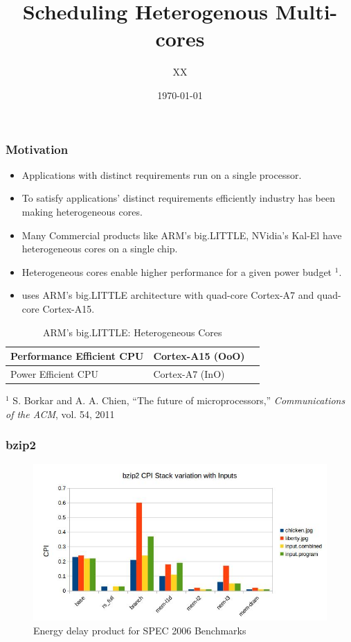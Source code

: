 \documentclass{beamer}
\title[Scheduling Heterogenous Multi-cores]{Scheduling Heterogenous Multi-cores} %
\author{XX} %
\institute[IIT Bombay] %
{
Guide: Prof XX \\ %
\medskip
}
\date{\today} %
\begin{document}
\begin{frame}
\titlepage %
\end{frame}

\begin{frame}
\frametitle{Motivation}
\begin{itemize}
\item Applications with distinct requirements run on a single processor.
\item To satisfy applications' distinct requirements efficiently industry has been making heterogeneous cores.
\item Many Commercial products like ARM's big.LITTLE, NVidia's Kal-El have heterogeneous cores on a single chip.
\item Heterogeneous cores enable higher performance for a given power budget $^1$.
\item {\color{blue}{Samsung's Galaxy S}} uses ARM's big.LITTLE architecture with quad-core Cortex-A7 and quad-core Cortex-A15.
\end{itemize}
\begin{table}[!h]
\vspace{-.3cm}
\centering
\begin{tabular}[bottom]{| l | l | l |}
\hline 
Performance Efficient CPU & Cortex-A15 (OoO)\\
\hline
Power Efficient CPU  & Cortex-A7	(InO) \\
\hline
\end{tabular}
\caption{ARM's big.LITTLE: Heterogeneous Cores}
\end{table}
\tiny $^1$ S. Borkar and A. A. Chien, “The future of microprocessors,” \textit{Communications of the ACM}, vol. 54, 2011
\end{frame}


\begin{frame}
\frametitle{bzip2}
\begin{figure}
\includegraphics[width=0.98\linewidth]{bzip2}
\caption{Energy delay product for SPEC 2006 Benchmarks}
\end{figure}
\end{frame}
\end{document}
